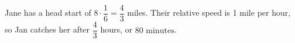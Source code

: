 Jane has a head start of $8\cdot\dfrac{1}{6}=\dfrac{4}{3}$ miles. Their relative speed is 1 mile per hour, so Jan catches her after $\dfrac{4}{3}$ hours, or $\boxed{80\text{ minutes}}$.
